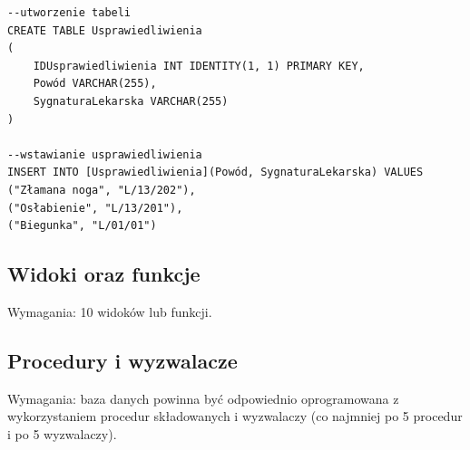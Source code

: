 \documentclass[60pt]{article}
\begin{document}
\begin{verbatim}
--utworzenie tabeli
CREATE TABLE Usprawiedliwienia
(
	IDUsprawiedliwienia INT IDENTITY(1, 1) PRIMARY KEY,
	Powód VARCHAR(255),
	SygnaturaLekarska VARCHAR(255)
)

--wstawianie usprawiedliwienia 
INSERT INTO [Usprawiedliwienia](Powód, SygnaturaLekarska) VALUES
("Złamana noga", "L/13/202"),
("Osłabienie", "L/13/201"), 
("Biegunka", "L/01/01")
\end{verbatim}

\subsection{Widoki oraz funkcje}

Wymagania: 10 widoków lub funkcji.

\subsection{Procedury i wyzwalacze}

Wymagania: baza danych powinna być odpowiednio oprogramowana z wykorzystaniem procedur składowanych i wyzwalaczy (co najmniej po 5 procedur i po 5 wyzwalaczy).
\end{document}
